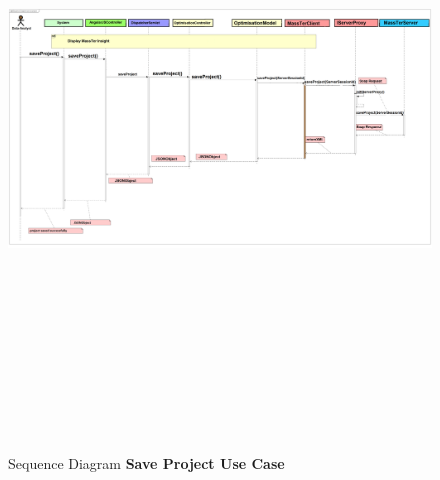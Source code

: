 	\begin{figure}[h]
		\centering
		\includegraphics[width=17.5cm,height=17cm]{SequenceDiagramSaveProject.png}
		\caption{Sequence Diagram \textbf{Save Project Use Case}}
	\end{figure}

